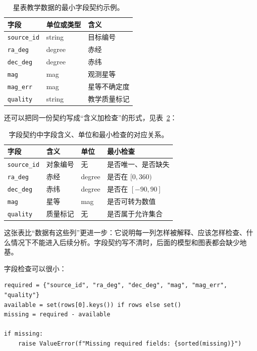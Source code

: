 \begin{table}[htbp]
\centering
\begin{tabular}{p{}p{}p{}}
\toprule
字段 & 单位或类型 & 含义 \\
\midrule
\texttt{source\_id} & string & 目标编号 \\
\texttt{ra\_deg} & degree & 赤经 \\
\texttt{dec\_deg} & degree & 赤纬 \\
\texttt{mag} & mag & 观测星等 \\
\texttt{mag\_err} & mag & 星等不确定度 \\
\texttt{quality} & string & 教学质量标记 \\
\bottomrule
\end{tabular}
\caption{星表教学数据的最小字段契约示例。}
\label{tab:ch06_field_contract_basic}
\end{table}

还可以把同一份契约写成“含义加检查”的形式，见表~\ref{tab:ch06_field_contract_checks}：

\begin{table}[htbp]
\centering
\begin{tabular}{p{}p{}p{}p{}}
\toprule
字段 & 含义 & 单位 & 最小检查 \\
\midrule
\texttt{source\_id} & 对象编号 & 无 & 是否唯一、是否缺失 \\
\texttt{ra\_deg} & 赤经 & degree & 是否在 \([0,360)\) \\
\texttt{dec\_deg} & 赤纬 & degree & 是否在 \([-90,90]\) \\
\texttt{mag} & 星等 & mag & 是否可转为数值 \\
\texttt{quality} & 质量标记 & 无 & 是否属于允许集合 \\
\bottomrule
\end{tabular}
\caption{字段契约中字段含义、单位和最小检查的对应关系。}
\label{tab:ch06_field_contract_checks}
\end{table}

这张表比“数据有这些列”更进一步：它说明每一列怎样被解释、应该怎样检查、什么情况下不能进入后续分析。字段契约写不清时，后面的模型和图表都会缺少地基。

字段检查可以很小：

\begin{examplebox}[检查必需字段]
\begin{lstlisting}[style=pythonstyle]
required = {"source_id", "ra_deg", "dec_deg", "mag", "mag_err", "quality"}
available = set(rows[0].keys()) if rows else set()
missing = required - available

if missing:
    raise ValueError(f"Missing required fields: {sorted(missing)}")
\end{lstlisting}
\end{examplebox}

